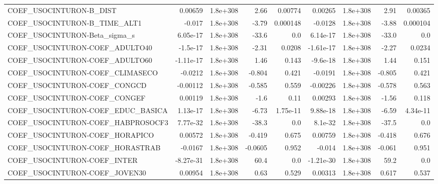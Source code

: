 \begin{tabular}{lrrrrrrrr}
COEF\_USOCINTURON-B\_DIST           &     0.00659 &     1.8e+308 &      2.66 &  0.00774 &    0.00265 &    1.8e+308 &         2.91 &       0.00365 \\
COEF\_USOCINTURON-B\_TIME\_ALT1      &      -0.017 &     1.8e+308 &     -3.79 & 0.000148 &    -0.0128 &    1.8e+308 &        -3.88 &      0.000104 \\
COEF\_USOCINTURON-Beta\_sigma\_s     &    6.05e-17 &     1.8e+308 &     -33.6 &      0.0 &   6.14e-17 &    1.8e+308 &        -33.0 &           0.0 \\
COEF\_USOCINTURON-COEF\_ADULTO40    &    -1.5e-17 &     1.8e+308 &     -2.31 &   0.0208 &  -1.61e-17 &    1.8e+308 &        -2.27 &        0.0234 \\
COEF\_USOCINTURON-COEF\_ADULTO60    &   -1.11e-17 &     1.8e+308 &      1.46 &    0.143 &   -9.6e-18 &    1.8e+308 &         1.44 &         0.151 \\
COEF\_USOCINTURON-COEF\_CLIMASECO   &     -0.0212 &     1.8e+308 &    -0.804 &    0.421 &    -0.0191 &    1.8e+308 &       -0.805 &         0.421 \\
COEF\_USOCINTURON-COEF\_CONGCD      &    -0.00112 &     1.8e+308 &    -0.585 &    0.559 &   -0.00226 &    1.8e+308 &       -0.578 &         0.563 \\
COEF\_USOCINTURON-COEF\_CONGEF      &     0.00119 &     1.8e+308 &      -1.6 &     0.11 &    0.00293 &    1.8e+308 &        -1.56 &         0.118 \\
COEF\_USOCINTURON-COEF\_EDUC\_BASICA &    1.13e-17 &     1.8e+308 &     -6.73 & 1.75e-11 &   9.88e-18 &    1.8e+308 &        -6.59 &      4.34e-11 \\
COEF\_USOCINTURON-COEF\_HABPROSOCF3 &    7.77e-32 &     1.8e+308 &     -38.3 &      0.0 &    8.1e-32 &    1.8e+308 &        -37.5 &           0.0 \\
COEF\_USOCINTURON-COEF\_HORAPICO    &     0.00572 &     1.8e+308 &    -0.419 &    0.675 &    0.00759 &    1.8e+308 &       -0.418 &         0.676 \\
COEF\_USOCINTURON-COEF\_HORASTRAB   &     -0.0167 &     1.8e+308 &   -0.0605 &    0.952 &     -0.014 &    1.8e+308 &       -0.061 &         0.951 \\
COEF\_USOCINTURON-COEF\_INTER       &   -8.27e-31 &     1.8e+308 &      60.4 &      0.0 &  -1.21e-30 &    1.8e+308 &         59.2 &           0.0 \\
COEF\_USOCINTURON-COEF\_JOVEN30     &     0.00954 &     1.8e+308 &      0.63 &    0.529 &    0.00313 &    1.8e+308 &        0.617 &         0.537 \\

\end{tabular}
